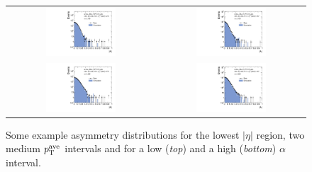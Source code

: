 \begin{figure}[!tp]
  \centering
  \begin{tabular}{cc}
                \includegraphics[width=0.49\textwidth]{figures/AsymmHistos_Eta0_pt4_alpha1_final_nominal_v4b.pdf} &
                \includegraphics[width=0.49\textwidth]{figures/AsymmHistos_Eta0_pt9_alpha1_final_nominal_v4b.pdf} \\ 
                \includegraphics[width=0.49\textwidth]{figures/AsymmHistos_Eta0_pt4_alpha5_final_nominal_v4b.pdf} &
                \includegraphics[width=0.49\textwidth]{figures/AsymmHistos_Eta0_pt9_alpha5_final_nominal_v4b.pdf}
  \end{tabular}
  \caption{Some example asymmetry distributions for the lowest $|\eta|$ region, two medium $p_{\text{T}}^\mathrm{ave}$ intervals and for a low (\textit{top}) and a high (\textit{bottom}) $\alpha$ interval.}
  \label{fig:asymm_dists}
\end{figure}

